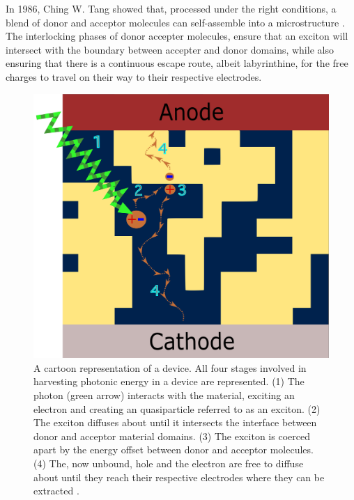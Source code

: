 In 1986, Ching W. Tang
showed that, processed under the right conditions, a blend of donor and acceptor molecules can self-assemble
into a  microstructure \cite{Tang1986c}. 
The interlocking phases of donor accepter molecules, ensure
that an exciton will intersect with the boundary between accepter and donor domains, while also ensuring that
there
is a continuous escape route, albeit labyrinthine, for the free charges to travel on their way to their respective
electrodes. 

\begin{figure}
    \center
    \includegraphics[width = .6\textwidth]{figures/BHJ-figure.png}
    \caption{A cartoon representation of a  device. All four stages involved in harvesting
    photonic energy in a  device are represented. (1) The photon (green arrow) interacts with the material,
    exciting an electron and creating an quasiparticle referred to as an exciton. (2) The exciton diffuses
    about until it intersects the interface between donor and acceptor material domains. (3) The exciton is
    coerced apart by the energy offset between donor and acceptor molecules. 
    (4) The, now unbound,  hole and the electron are free to diffuse about until they reach their respective
    electrodes where they can be extracted \cite{Fusella2019}.}
    \label{bhj}
\end{figure}


